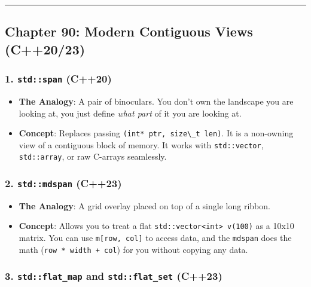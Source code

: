 \begin{center}\rule{0.5\linewidth}{0.5pt}\end{center}

\hypertarget{chapter-90-modern-contiguous-views-c2023}{%
\subsection{Chapter 90: Modern Contiguous Views
(C++20/23)}\label{chapter-90-modern-contiguous-views-c2023}}

\hypertarget{stdspan-c20}{%
\subsubsection{\texorpdfstring{1. \texttt{std::span}
(C++20)}{1. std::span (C++20)}}\label{stdspan-c20}}

\begin{itemize}
\tightlist
\item
  \textbf{The Analogy}: A pair of binoculars. You don't own the
  landscape you are looking at, you just define \emph{what part} of it
  you are looking at.
\item
  \textbf{Concept}: Replaces passing
  \passthrough{\lstinline!(int* ptr, size\_t len)!}. It is a non-owning
  view of a contiguous block of memory. It works with
  \passthrough{\lstinline!std::vector!},
  \passthrough{\lstinline!std::array!}, or raw C-arrays seamlessly.
\end{itemize}

\hypertarget{stdmdspan-c23}{%
\subsubsection{\texorpdfstring{2. \texttt{std::mdspan}
(C++23)}{2. std::mdspan (C++23)}}\label{stdmdspan-c23}}

\begin{itemize}
\tightlist
\item
  \textbf{The Analogy}: A grid overlay placed on top of a single long
  ribbon.
\item
  \textbf{Concept}: Allows you to treat a flat
  \passthrough{\lstinline!std::vector<int> v(100)!} as a 10x10 matrix.
  You can use \passthrough{\lstinline!m[row, col]!} to access data, and
  the \passthrough{\lstinline!mdspan!} does the math
  (\passthrough{\lstinline!row * width + col!}) for you without copying
  any data.
\end{itemize}

\hypertarget{stdflat_map-and-stdflat_set-c23}{%
\subsubsection{\texorpdfstring{3. \texttt{std::flat\_map} and
\texttt{std::flat\_set}
(C++23)}{3. std::flat\_map and std::flat\_set (C++23)}}\label{stdflat_map-and-stdflat_set-c23}}

